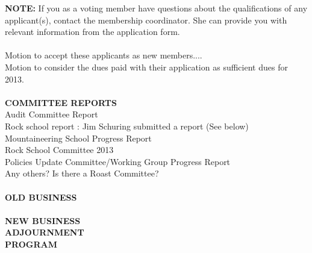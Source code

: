 \documentclass[10pt,a4paper]{article}
\begin{document}
\begin{multicols}{2}
\textbf{NOTE:} If you as a voting member have questions about the qualifications of any applicant(s), contact the membership coordinator. She can provide you with relevant information from the application form.
\\
\\
Motion to accept these applicants as new members....\\
Motion to consider the dues paid with their application as sufficient dues for 2013.
\\
\\
\textbf{COMMITTEE REPORTS}\\
Audit Committee Report \\
Rock school report : Jim Schuring submitted a report (See below)\\
Mountaineering School Progress Report\\
Rock School Committee 2013\\
Policies Update Committee/Working Group Progress Report \\
Any others?  Is there a Roast Committee? 
\\
\\
\textbf{OLD BUSINESS}
\\
\\
\textbf{NEW BUSINESS}
\\
\textbf{ADJOURNMENT}\\
\textbf{PROGRAM}


\end{multicols}
\end{document}

